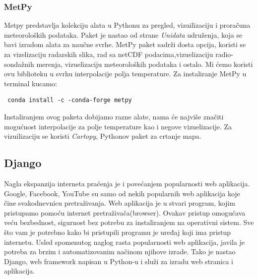 \documentclass[12pt]{article}
\begin{document}
\subsubsection{MetPy}
Metpy predstavlja kolekciju alata u Pythonu za pregled, vizuilizaciju i proračuna meteoroloških podataka. Paket je nastao od strane \textsl{Unidata} udruženja, koja se bavi izradom alata za naučne svrhe. MetPy paket sadrži dosta opcija, koristi se za vizelizaciju radarskih slika, rad sa netCDF podacima,vizuelizaciju radio-sondažnih merenja, vizuelizaciju meteoroloških podataka i ostalo. Mi ćemo koristi ovu biblioteku u svrhu interpolacije polja temperature. Za instaliranje MetPy u terminal kucamo:
\begin{lstlisting}
 conda install -c -conda-forge metpy
\end{lstlisting}
Instaliranjem ovog paketa dobijamo razne alate, nama će najviše značiti mogućnost interpolacije za polje temperature kao i negove vizuelizacije. Za vizuilizaciju se koristi \textsl{Cartopy}, Pythonov paket za crtanje mapa.



\subsection{Django}

Nagla ekspanzija interneta praćenja je i povećanjem popularnosti web aplikacija. Google, Facebook, YouTube su samo od nekih popularnih web aplikacija koje čine svakodnevnicu pretraživanja. Web aplikacija je u stvari program, kojim pristupamo pomoću internet pretraživača(browser). Ovakav pristup omogućava veću bezbednost, sigurnost bez potrebu za instaliranjem na operativni sistem. Sve što vam je potrebno kako bi pristupili programu je uređaj koji ima pristup internetu. 
Usled spomenutog naglog rasta popularnosti web aplikacija, javila je potreba za brzim i automatizovanim načinom njihove izrade. Tako je nastao Django, web framework napisan u Python-u i služi za izradu web stranica i aplikacija. 
\end{document}

